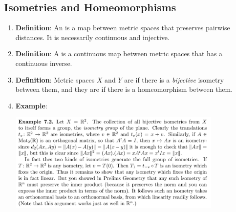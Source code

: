 \newpage
\subsection{Isometries and Homeomorphisms}
\begin{enumerate}
\item {\bf Definition}: An  is a map between metric spaces that preserves pairwise distances. It is
  necessarily continuous and injective.
\item {\bf Definition}: A  is a continuous map between metric spaces that has a
  continuous inverse.
\item {\bf Definition}: Metric spaces $X$ and $Y$ are  if there is a {\it
    bijective} isometry between them, and they are  if there is a homeomorphism
  between them.
\item {\bf Example}:
  \begin{mdframed}
    \includegraphics[width=300pt]{img/oxford-a2-isometry-group.png}
  \end{mdframed}
\end{enumerate}

